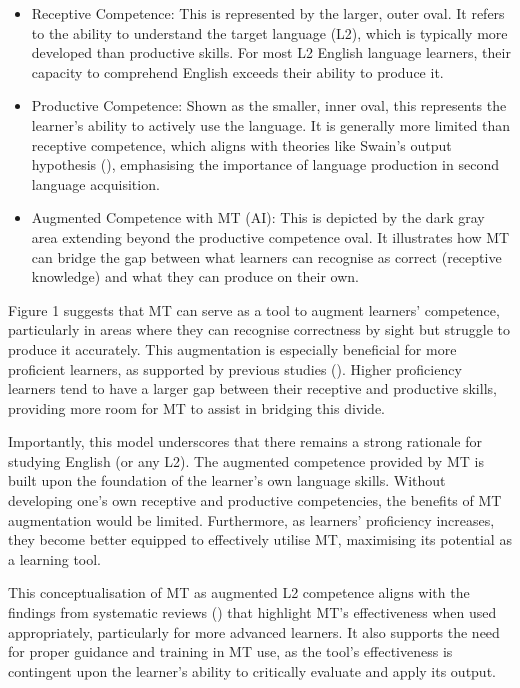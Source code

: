 \documentclass[output=paper]{langscibook}
\begin{document}
\begin{itemize}
\item Receptive Competence: This is represented by the larger, outer oval. It refers to the ability to understand the target language (L2), which is typically more developed than productive skills. For most L2 English language learners, their capacity to comprehend English exceeds their ability to produce it.
\item Productive Competence: Shown as the smaller, inner oval, this represents the learner's ability to actively use the language. It is generally more limited than receptive competence, which aligns with theories like Swain’s output hypothesis (\citeyear{swain1985}), emphasising the importance of language production in second language acquisition.
\item Augmented Competence with MT (AI): This is depicted by the dark gray area extending beyond the productive competence oval. It illustrates how MT can bridge the gap between what learners can recognise as correct (receptive knowledge) and what they can produce on their own.
\end{itemize}

Figure 1 suggests that MT can serve as a tool to augment learners’ competence, particularly in areas where they can recognise correctness by sight but struggle to produce it accurately. This augmentation is especially beneficial for more proficient learners, as supported by previous studies (\citealt{klimova22, ohashi2024}). Higher proficiency learners tend to have a larger gap between their receptive and productive skills, providing more room for MT to assist in bridging this divide.

Importantly, this model underscores that there remains a strong rationale for studying English (or any L2). The augmented competence provided by MT is built upon the foundation of the learner's own language skills. Without developing one’s own receptive and productive competencies, the benefits of MT augmentation would be limited. Furthermore, as learners’ proficiency increases, they become better equipped to effectively utilise MT, maximising its potential as a learning tool.

This conceptualisation of MT as augmented L2 competence aligns with the findings from systematic reviews (\citealt{jolley22, lee23}) that highlight MT’s effectiveness when used appropriately, particularly for more advanced learners. It also supports the need for proper guidance and training in MT use, as the tool’s effectiveness is contingent upon the learner's ability to critically evaluate and apply its output.
\end{document}
